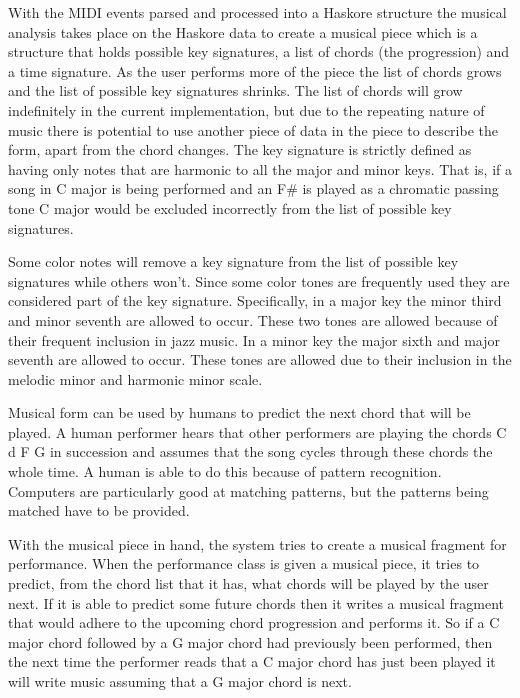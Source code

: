 \documentclass[12pt]{ucthesis}
\begin{document}
With the MIDI events parsed and processed into a Haskore structure the musical analysis takes place on the Haskore data to create a musical piece which is a structure that holds possible key signatures, a list of chords (the progression) and a time signature. As the user performs more of the piece the list of chords grows and the list of possible key signatures shrinks. The list of chords will grow indefinitely in the current implementation, but due to the repeating nature of music there is potential to use another piece of data in the piece to describe the form, apart from the chord changes. The key signature is strictly defined as having only notes that are harmonic to all the major and minor keys. That is, if a song in C major is being performed and an F\# is played as a chromatic passing tone C major would be excluded incorrectly from the list of possible key signatures. 

Some color notes will remove a key signature from the list of possible key signatures while others won't. Since some color tones are frequently used they are considered part of the key signature.  Specifically, in a major key the minor third and minor seventh are allowed to occur. These two tones are allowed because of their frequent inclusion in jazz music. In a minor key the major sixth and major seventh are allowed to occur. These tones are allowed due to their inclusion in the melodic minor and harmonic minor scale. 

Musical form can be used by humans to predict the next chord that will be played. A human performer hears that other performers are playing the chords C d F G in succession and assumes that the song cycles through these chords the whole time. A human is able to do this because of pattern recognition. Computers are particularly good at matching patterns, but the patterns being matched have to be provided.

With the musical piece in hand, the system tries to create a musical fragment for performance. When the performance class is given a musical piece, it tries to predict, from the chord list that it has, what chords will be played by the user next. If it is able to predict some future chords then it writes a musical fragment that would adhere to the upcoming chord progression and performs it. So if a C major chord followed by a G major chord had previously been performed, then the next time the performer reads that a C major chord has just been played it will write music assuming that a G major chord is next. 
\end{document}
